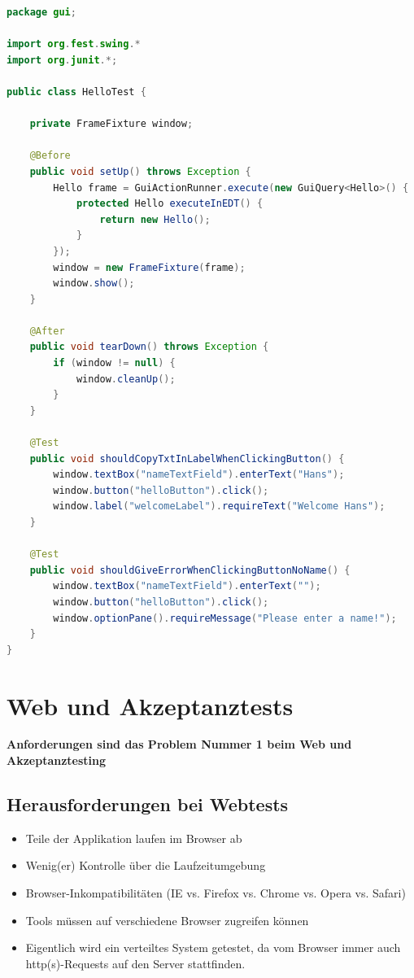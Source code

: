 \documentclass[a4paper,10pt]{article}
\newcommand{\Bold}[1]{\textbf{#1}} %
\begin{document}
\begin{lstlisting}[language=Java,caption=FEST Beispiel 1.b, style=MyJavaStyle]
package gui;

import org.fest.swing.*
import org.junit.*;

public class HelloTest {

    private FrameFixture window;

    @Before
    public void setUp() throws Exception {
        Hello frame = GuiActionRunner.execute(new GuiQuery<Hello>() {
            protected Hello executeInEDT() {
                return new Hello();
            }
        });
        window = new FrameFixture(frame);
        window.show();
    }

    @After
    public void tearDown() throws Exception {
        if (window != null) {
            window.cleanUp();
        }
    }

    @Test
    public void shouldCopyTxtInLabelWhenClickingButton() {
        window.textBox("nameTextField").enterText("Hans");
        window.button("helloButton").click();
        window.label("welcomeLabel").requireText("Welcome Hans");
    }
    
    @Test
    public void shouldGiveErrorWhenClickingButtonNoName() {
        window.textBox("nameTextField").enterText("");
        window.button("helloButton").click();
        window.optionPane().requireMessage("Please enter a name!");
    }
}
\end{lstlisting}
\pagebreak
\section{Web und Akzeptanztests}
\textbf{\Bold Anforderungen sind das Problem Nummer 1 beim Web und Akzeptanztesting}\\
\subsection{Herausforderungen bei Webtests}
\begin{itemize}
\item Teile der Applikation laufen im Browser ab
\item Wenig(er) Kontrolle über die Laufzeitumgebung
\item Browser-Inkompatibilitäten (IE vs. Firefox vs. Chrome vs. Opera vs. Safari)
\item Tools müssen auf verschiedene Browser zugreifen können
\item Eigentlich wird ein verteiltes System getestet, da vom Browser immer auch http(s)-Requests auf den Server stattfinden.
\end{itemize}
\end{document}
